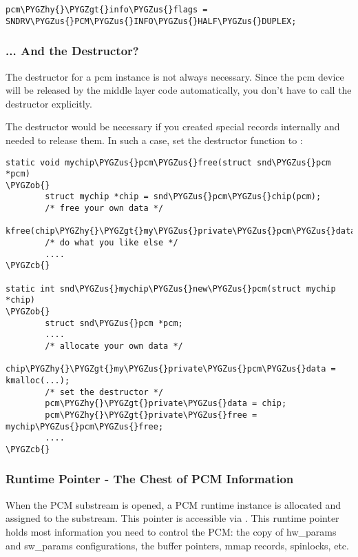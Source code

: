 \documentclass[a4paper,8pt,english]{sphinxmanual}
\def\PYGZus{\char`\_}
\def\PYGZob{\char`\{}
\def\PYGZcb{\char`\}}
\def\PYGZgt{\char`\>}
\def\PYGZhy{\char`\-}
\begin{document}
\begin{Verbatim}[commandchars=\\\{\}]
pcm\PYGZhy{}\PYGZgt{}info\PYGZus{}flags = SNDRV\PYGZus{}PCM\PYGZus{}INFO\PYGZus{}HALF\PYGZus{}DUPLEX;
\end{Verbatim}


\subsubsection{... And the Destructor?}
\label{sound/kernel-api/writing-an-alsa-driver:and-the-destructor}
The destructor for a pcm instance is not always necessary. Since the pcm
device will be released by the middle layer code automatically, you
don't have to call the destructor explicitly.

The destructor would be necessary if you created special records
internally and needed to release them. In such a case, set the
destructor function to :

\begin{Verbatim}[commandchars=\\\{\}]
static void mychip\PYGZus{}pcm\PYGZus{}free(struct snd\PYGZus{}pcm *pcm)
\PYGZob{}
        struct mychip *chip = snd\PYGZus{}pcm\PYGZus{}chip(pcm);
        /* free your own data */
        kfree(chip\PYGZhy{}\PYGZgt{}my\PYGZus{}private\PYGZus{}pcm\PYGZus{}data);
        /* do what you like else */
        ....
\PYGZcb{}

static int snd\PYGZus{}mychip\PYGZus{}new\PYGZus{}pcm(struct mychip *chip)
\PYGZob{}
        struct snd\PYGZus{}pcm *pcm;
        ....
        /* allocate your own data */
        chip\PYGZhy{}\PYGZgt{}my\PYGZus{}private\PYGZus{}pcm\PYGZus{}data = kmalloc(...);
        /* set the destructor */
        pcm\PYGZhy{}\PYGZgt{}private\PYGZus{}data = chip;
        pcm\PYGZhy{}\PYGZgt{}private\PYGZus{}free = mychip\PYGZus{}pcm\PYGZus{}free;
        ....
\PYGZcb{}
\end{Verbatim}


\subsubsection{Runtime Pointer - The Chest of PCM Information}
\label{sound/kernel-api/writing-an-alsa-driver:runtime-pointer-the-chest-of-pcm-information}
When the PCM substream is opened, a PCM runtime instance is allocated
and assigned to the substream. This pointer is accessible via
. This runtime pointer holds most information you
need to control the PCM: the copy of hw\_params and sw\_params
configurations, the buffer pointers, mmap records, spinlocks, etc.
\end{document}
